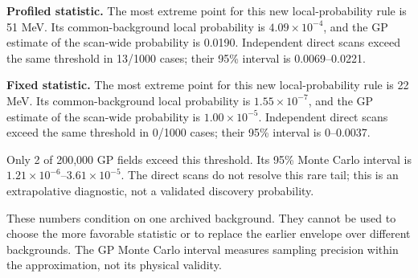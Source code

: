 \textbf{Profiled statistic.} The most extreme point for this new local-probability rule is 51 MeV. Its common-background local probability is $4.09\times10^{-4}$, and the GP estimate of the scan-wide probability is 0.0190. Independent direct scans exceed the same threshold in 13/1000 cases; their 95\% interval is 0.0069--0.0221.

\textbf{Fixed statistic.} The most extreme point for this new local-probability rule is 22 MeV. Its common-background local probability is $1.55\times10^{-7}$, and the GP estimate of the scan-wide probability is $1.00\times10^{-5}$. Independent direct scans exceed the same threshold in 0/1000 cases; their 95\% interval is 0--0.0037.

Only 2 of 200,000 GP fields exceed this threshold. Its 95\% Monte Carlo interval is $1.21\times10^{-6}$--$3.61\times10^{-5}$. The direct scans do not resolve this rare tail; this is an extrapolative diagnostic, not a validated discovery probability.

These numbers condition on one archived background. They cannot be used to choose the more favorable statistic or to replace the earlier envelope over different backgrounds. The GP Monte Carlo interval measures sampling precision within the approximation, not its physical validity.
